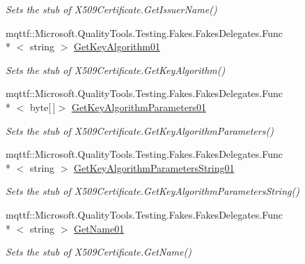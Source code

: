\begin{DoxyCompactItemize}
\begin{DoxyCompactList}\small\item\em Sets the stub of X509\-Certificate.\-Get\-Issuer\-Name()\end{DoxyCompactList}\item 
mqttf\-::\-Microsoft.\-Quality\-Tools.\-Testing.\-Fakes.\-Fakes\-Delegates.\-Func\\*
$<$ string $>$ \hyperlink{class_system_1_1_security_1_1_cryptography_1_1_x509_certificates_1_1_fakes_1_1_stub_x509_certificate2_a26d4de12b688a948a367a61087426407}{Get\-Key\-Algorithm01}
\begin{DoxyCompactList}\small\item\em Sets the stub of X509\-Certificate.\-Get\-Key\-Algorithm()\end{DoxyCompactList}\item 
mqttf\-::\-Microsoft.\-Quality\-Tools.\-Testing.\-Fakes.\-Fakes\-Delegates.\-Func\\*
$<$ byte\mbox{[}$\,$\mbox{]}$>$ \hyperlink{class_system_1_1_security_1_1_cryptography_1_1_x509_certificates_1_1_fakes_1_1_stub_x509_certificate2_a10b6d1fb473c03dc13e5921522c91b6f}{Get\-Key\-Algorithm\-Parameters01}
\begin{DoxyCompactList}\small\item\em Sets the stub of X509\-Certificate.\-Get\-Key\-Algorithm\-Parameters()\end{DoxyCompactList}\item 
mqttf\-::\-Microsoft.\-Quality\-Tools.\-Testing.\-Fakes.\-Fakes\-Delegates.\-Func\\*
$<$ string $>$ \hyperlink{class_system_1_1_security_1_1_cryptography_1_1_x509_certificates_1_1_fakes_1_1_stub_x509_certificate2_a062bbc9db35034aaeeaee0be2d7faacc}{Get\-Key\-Algorithm\-Parameters\-String01}
\begin{DoxyCompactList}\small\item\em Sets the stub of X509\-Certificate.\-Get\-Key\-Algorithm\-Parameters\-String()\end{DoxyCompactList}\item 
mqttf\-::\-Microsoft.\-Quality\-Tools.\-Testing.\-Fakes.\-Fakes\-Delegates.\-Func\\*
$<$ string $>$ \hyperlink{class_system_1_1_security_1_1_cryptography_1_1_x509_certificates_1_1_fakes_1_1_stub_x509_certificate2_a9ec482b9d1ee34f949ee2a5f8021c346}{Get\-Name01}
\begin{DoxyCompactList}\small\item\em Sets the stub of X509\-Certificate.\-Get\-Name()\end{DoxyCompactList}\item 

\end{DoxyCompactItemize}
